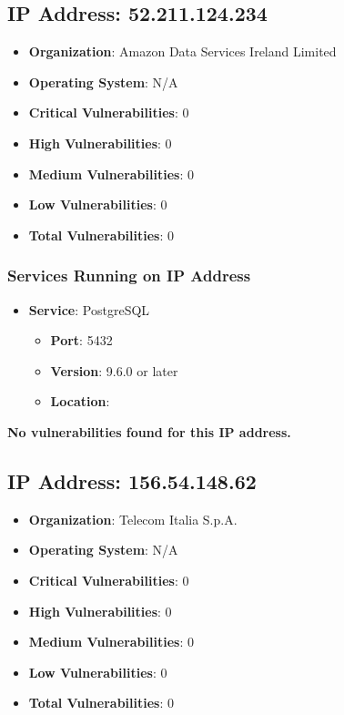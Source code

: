 \documentclass{article}
\begin{document}
\clearpage



\subsection{IP Address: 52.211.124.234}

\begin{itemize}
    \item \textbf{Organization}: Amazon Data Services Ireland Limited
    \item \textbf{Operating System}:  N/A 
    \item \textbf{Critical Vulnerabilities}: 0
    \item \textbf{High Vulnerabilities}: 0
    \item \textbf{Medium Vulnerabilities}: 0
    \item \textbf{Low Vulnerabilities}: 0
    \item \textbf{Total Vulnerabilities}: 0
\end{itemize}

\subsubsection*{Services Running on IP Address}

\begin{itemize}
    
        \item \textbf{Service}: PostgreSQL
        \begin{itemize}
            \item \textbf{Port}: 5432
            \item \textbf{Version}:  9.6.0 or later 
            \item \textbf{Location}: \href{  }{  }
        \end{itemize}
    
\end{itemize}


\textbf{No vulnerabilities found for this IP address.}




\clearpage



\subsection{IP Address: 156.54.148.62}

\begin{itemize}
    \item \textbf{Organization}: Telecom Italia S.p.A.
    \item \textbf{Operating System}:  N/A 
    \item \textbf{Critical Vulnerabilities}: 0
    \item \textbf{High Vulnerabilities}: 0
    \item \textbf{Medium Vulnerabilities}: 0
    \item \textbf{Low Vulnerabilities}: 0
    \item \textbf{Total Vulnerabilities}: 0
\end{itemize}
\end{document}
